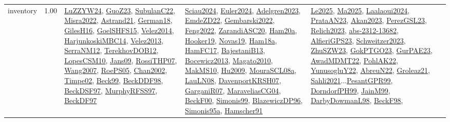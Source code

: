{\begin{longtable}{p{3cm}r>{\raggedright\arraybackslash}p{6cm}>{\raggedright\arraybackslash}p{6cm}>{\raggedright\arraybackslash}p{8cm}}
\index{inventory}\index{Concepts!inventory}inventory &  1.00 & \hyperref[detail:LuZZYW24]{LuZZYW24}, \hyperref[detail:GuoZ23]{GuoZ23}, \hyperref[detail:SubulanC22]{SubulanC22}, \hyperref[detail:Misra2022]{Misra2022}, \hyperref[detail:Astrand21]{Astrand21}, \hyperref[detail:German18]{German18}, \hyperref[detail:GilesH16]{GilesH16}, \hyperref[detail:GoelSHFS15]{GoelSHFS15}, \hyperref[detail:Velez2014]{Velez2014}, \hyperref[detail:HarjunkoskiMBC14]{HarjunkoskiMBC14}, \hyperref[detail:Velez2013]{Velez2013}, \hyperref[detail:SerraNM12]{SerraNM12}, \hyperref[detail:TerekhovDOB12]{TerekhovDOB12}, \hyperref[detail:LopesCSM10]{LopesCSM10}, \hyperref[detail:Jans09]{Jans09}, \hyperref[detail:RossiTHP07]{RossiTHP07}, \hyperref[detail:Wang2007]{Wang2007}, \hyperref[detail:RoePS05]{RoePS05}, \hyperref[detail:Chan2002]{Chan2002}, \hyperref[detail:Timpe02]{Timpe02}, \hyperref[detail:Beck99]{Beck99}, \hyperref[detail:BeckDDF98]{BeckDDF98}, \hyperref[detail:BeckDSF97]{BeckDSF97}, \hyperref[detail:MurphyRFSS97]{MurphyRFSS97}, \hyperref[detail:BeckDF97]{BeckDF97} & \hyperref[detail:Sciau2024]{Sciau2024}, \hyperref[detail:Euler2024]{Euler2024}, \hyperref[detail:Adelgren2023]{Adelgren2023}, \hyperref[detail:EmdeZD22]{EmdeZD22}, \hyperref[detail:Gembarski2022]{Gembarski2022}, \hyperref[detail:Feng2022]{Feng2022}, \hyperref[detail:ZarandiASC20]{ZarandiASC20}, \hyperref[detail:Ham20a]{Ham20a}, \hyperref[detail:Hooker19]{Hooker19}, \hyperref[detail:Novas19]{Novas19}, \hyperref[detail:Ham18a]{Ham18a}, \hyperref[detail:HamFC17]{HamFC17}, \hyperref[detail:BajestaniB13]{BajestaniB13}, \hyperref[detail:Bocewicz2013]{Bocewicz2013}, \hyperref[detail:Magato2010]{Magato2010}, \hyperref[detail:MakMS10]{MakMS10}, \hyperref[detail:Hu2009]{Hu2009}, \hyperref[detail:MouraSCL08a]{MouraSCL08a}, \hyperref[detail:LauLN08]{LauLN08}, \hyperref[detail:DavenportKRSH07]{DavenportKRSH07}, \hyperref[detail:GarganiR07]{GarganiR07}, \hyperref[detail:MaraveliasCG04]{MaraveliasCG04}, \hyperref[detail:BeckF00]{BeckF00}, \hyperref[detail:Simonis99]{Simonis99}, \hyperref[detail:BlazewiczDP96]{BlazewiczDP96}, \hyperref[detail:Simonis95a]{Simonis95a}, \hyperref[detail:Hamscher91]{Hamscher91} & \hyperref[detail:Le2025]{Le2025}, \hyperref[detail:Ma2025]{Ma2025}, \hyperref[detail:Laalaoui2024]{Laalaoui2024}, \hyperref[detail:PrataAN23]{PrataAN23}, \hyperref[detail:Akan2023]{Akan2023}, \hyperref[detail:PerezGSL23]{PerezGSL23}, \hyperref[detail:Relich2023]{Relich2023}, \hyperref[detail:abs-2312-13682]{abs-2312-13682}, \hyperref[detail:AlfieriGPS23]{AlfieriGPS23}, \hyperref[detail:Schweitzer2023]{Schweitzer2023}, \hyperref[detail:ZhuSZW23]{ZhuSZW23}, \hyperref[detail:GokPTGO23]{GokPTGO23}, \hyperref[detail:GurPAE23]{GurPAE23}, \hyperref[detail:AwadMDMT22]{AwadMDMT22}, \hyperref[detail:PohlAK22]{PohlAK22}, \hyperref[detail:YunusogluY22]{YunusogluY22}, \hyperref[detail:AbreuN22]{AbreuN22}, \hyperref[detail:Groleaz21]{Groleaz21}, \hyperref[detail:Sahli2021]{Sahli2021}...\hyperref[detail:PesantGPR99]{PesantGPR99}, \hyperref[detail:DorndorfPH99]{DorndorfPH99}, \hyperref[detail:JainM99]{JainM99}, \hyperref[detail:DarbyDowmanL98]{DarbyDowmanL98}, \hyperref[detail:BeckF98]{BeckF98}, 
\end{longtable}}
